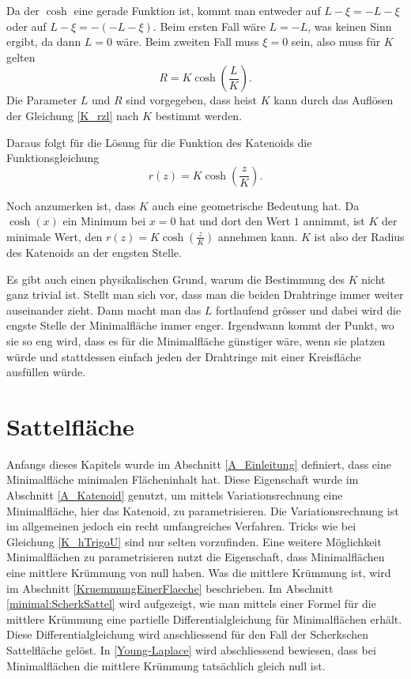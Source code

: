 \begin{refsection}
Da der $\cosh$ eine gerade Funktion ist, kommt man entweder auf $L-\xi=-L-\xi$ oder auf $L-\xi=-(-L-\xi)$. 
Beim ersten Fall wäre $L=-L$, was keinen Sinn ergibt, da dann $L=0$ wäre. Beim zweiten Fall muss $\xi=0$ sein, also muss für $K$ gelten 
\begin{equation} \label{K_rzl}
R=K \cosh\left(\frac{L}{K}\right).
\end{equation}
Die Parameter $L$ und $R$ sind vorgegeben, dass heist $K$ kann durch das Auflösen der Gleichung \eqref{K_rzl} nach $K$ bestimmt werden.

Daraus folgt für die Lösung für die Funktion des Katenoids die Funktionsgleichung 
\begin{equation} \label{K_rz}
r(z)=K \cosh\left(\frac{z}{K}\right).
\end{equation}

Noch anzumerken ist, dass $K$ auch eine geometrische Bedeutung hat. Da $\cosh(x)$ ein Minimum bei $x=0$ hat und dort den Wert $1$ annimmt, ist $K$ der minimale Wert, den $r(z)=K \cosh\left(\frac{z}{K}\right)$ annehmen kann. $K$ ist also der Radius des 
Katenoids an der engsten Stelle.

Es gibt auch einen physikalischen Grund, warum die Bestimmung des $K $ nicht ganz trivial ist. 
Stellt man sich vor, dass man die beiden Drahtringe immer weiter auseinander zieht. Dann macht man das $L$ fortlaufend grösser und dabei wird die engste Stelle der Minimalfläche immer enger. Irgendwann kommt der Punkt, wo sie so eng wird, dass es für die Minimalfläche günstiger wäre, wenn sie platzen würde und stattdessen einfach jeden der Drahtringe mit einer Kreisfläche ausfüllen würde.


\section{Sattelfläche}
Anfangs dieses Kapitels wurde im Abschnitt \ref{A_Einleitung} definiert, dass eine Minimalfläche minimalen Flächeninhalt hat. Diese Eigenschaft wurde im Abschnitt \ref{A_Katenoid} genutzt, um mittels Variationsrechnung eine Minimalfläche, hier das Katenoid, zu parametrisieren. Die Variationsrechnung ist im allgemeinen jedoch ein recht umfangreiches Verfahren. Tricks wie bei Gleichung \ref{K_hTrigoU} sind nur selten vorzufinden. Eine weitere Möglichkeit Minimalflächen zu parametrisieren nutzt die Eigenschaft, dass Minimalflächen eine mittlere Krümmung von null haben. Was die mittlere Krümmung ist, wird im Abschnitt \ref{KruemmungEinerFlaeche} beschrieben. Im Abschnitt \ref{minimal:ScherkSattel} wird aufgezeigt, wie man mittels einer Formel für die mittlere Krümmung eine partielle Differentialgleichung für Minimalflächen erhält. Diese Differentialgleichung wird anschliessend für den Fall der Scherkschen Sattelfläche gelöst. In \ref{Young-Laplace} wird abschliessend bewiesen, dass bei Minimalflächen die mittlere Krümmung tatsächlich gleich null ist.


\end{refsection}
